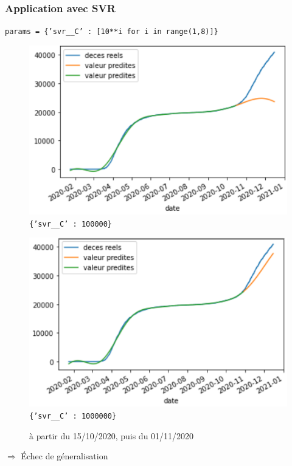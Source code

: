 \documentclass{beamer}[aspectratio = 43]
\begin{document}
\begin{frame}
	\frametitle{Application avec SVR}
		\texttt{params = \{'svr\_\_C' : [10**i for i in range(1,8)]\}}\\
	\begin{figure}[h]
		\centering
		\begin{minipage}{0.5\textwidth}
			\includegraphics[scale=0.42]{SVR_avant_pt_dinflexion_}
			\centering
			\tiny{\texttt{\{'svr\_\_C' : 100000\}}}
		\end{minipage}%
		\begin{minipage}{0.5\textwidth}
			\includegraphics[scale=0.42]{SVR_apres_pt_dinflexion_}
			\centering
			\tiny{\texttt{\{'svr\_\_C' : 1000000\}}}
		\end{minipage}
	\caption{à partir du 15/10/2020, puis du 01/11/2020}
	\end{figure}
	$\Rightarrow$ \'Echec de géneralisation
\end{frame}
\end{document}
